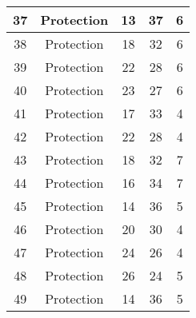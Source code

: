 \documentclass[results.tex]{subfiles}
\begin{document}
\begin{center}
\begin{tabular}{| c || c | c | c | c |}
            \hline
            37                      & Protection                   & 13                     & 37                      & 6                    \\
            \hline
            38                      & Protection                   & 18                     & 32                      & 6                    \\
            \hline
            39                      & Protection                   & 22                     & 28                      & 6                    \\
            \hline
            40                      & Protection                   & 23                     & 27                      & 6                    \\
            \hline
            41                      & Protection                   & 17                     & 33                      & 4                    \\
            \hline
            42                      & Protection                   & 22                     & 28                      & 4                    \\
            \hline
            43                      & Protection                   & 18                     & 32                      & 7                    \\
            \hline
            44                      & Protection                   & 16                     & 34                      & 7                    \\
            \hline
            45                      & Protection                   & 14                     & 36                      & 5                    \\
            \hline
            46                      & Protection                   & 20                     & 30                      & 4                    \\
            \hline
            47                      & Protection                   & 24                     & 26                      & 4                    \\
            \hline
            48                      & Protection                   & 26                     & 24                      & 5                    \\
            \hline
            49                      & Protection                   & 14                     & 36                      & 5                    \\
            \hline
        \end{tabular}
    \end{center}
\end{document}
